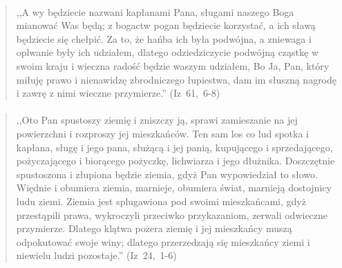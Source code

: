 \documentclass[10pt,a4paper,oneside]{article}
\begin{document}
\paragraph{}
\begin{quote}
,,A wy będziecie nazwani kapłanami Pana, sługami naszego Boga mianować Was będą; z bogactw pogan będziecie korzystać, a ich sławą będziecie się chełpić. Za to, że hańba ich była podwójna, a zniewaga i oplwanie były ich udziałem, dlatego odziedziczycie podwójną cząstkę w swoim kraju i wieczna radość będzie waszym udziałem, Bo Ja, Pan, który miłuję prawo i nienawidzę zbrodniczego łupiestwa, dam im słuszną nagrodę i zawrę z nimi wieczne przymierze.'' \mbox{(Iz 61, 6-8)}
\end{quote}
\paragraph{}
\begin{quote}
,,Oto Pan spustoszy ziemię i zniszczy ją, sprawi zamieszanie na jej powierzchni i rozproszy jej mieszkańców. Ten sam los co lud spotka i kapłana, sługę i jego pana, służącą i jej panią, kupującego i sprzedającego, pożyczającego i biorącego pożyczkę, lichwiarza i jego dłużnika. Doszczętnie spustoszona i złupiona będzie ziemia, gdyż Pan wypowiedział to słowo. Więdnie i obumiera ziemia, marnieje, obumiera świat, marnieją dostojnicy ludu ziemi. Ziemia jest splugawiona pod swoimi mieszkańcami, gdyż przestąpili prawa, wykroczyli przeciwko przykazaniom, zerwali odwieczne przymierze. Dlatego klątwa pożera ziemię i jej mieszkańcy muszą odpokutować swoje winy; dlatego przerzedzają się mieszkańcy ziemi i niewielu ludzi pozostaje.'' \mbox{(Iz 24, 1-6)}
\end{quote}
\end{document}
